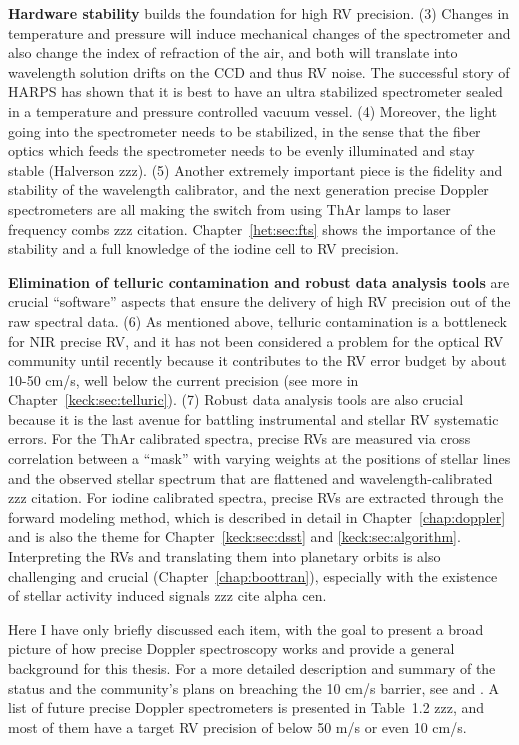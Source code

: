 {\bf Hardware stability} builds the foundation for high RV
precision. (3) Changes in temperature and pressure will induce mechanical
changes of the spectrometer and also change the index of refraction of
the air, and both will translate into wavelength solution drifts on
the CCD and thus RV noise. The successful story of HARPS has shown
that it is best to have an ultra stabilized spectrometer sealed in a
temperature and pressure controlled vacuum vessel. (4) Moreover, the light
going into the spectrometer needs to be stabilized, in the sense that
the fiber optics which feeds the spectrometer needs to be evenly
illuminated and stay stable (Halverson zzz). (5) Another extremely
important piece is the fidelity and stability of the wavelength
calibrator, and the next generation precise Doppler spectrometers are
all making the switch from using ThAr lamps to laser frequency combs
zzz citation. Chapter~\ref{het:sec:fts} shows the importance of the
stability and a full knowledge of the iodine cell to RV precision.

{\bf Elimination of telluric contamination and robust data analysis
tools} are crucial ``software'' aspects that ensure the delivery of
high RV precision out of the raw spectral data. (6) As mentioned
above, telluric contamination is a bottleneck for NIR precise RV, and
it has not been considered a problem for the optical RV community
until recently because it contributes to the RV error budget by about
10-50 cm/s, well below the current precision (see more in
Chapter~\ref{keck:sec:telluric}). (7) Robust data analysis tools are
also crucial because it is the last avenue for battling instrumental
and stellar RV systematic errors. For the ThAr calibrated spectra,
precise RVs are measured via cross correlation between a ``mask'' with
varying weights at the positions of stellar lines and the observed
stellar spectrum that are flattened and wavelength-calibrated zzz
citation. For iodine calibrated spectra, precise RVs are extracted
through the forward modeling method, which is described in detail in
Chapter~\ref{chap:doppler} and is also the theme for
Chapter~\ref{keck:sec:dsst} and \ref{keck:sec:algorithm}. Interpreting
the RVs and translating them into planetary orbits is also challenging
and crucial (Chapter~\ref{chap:boottran}), especially with the
existence of stellar activity induced signals zzz cite alpha cen.

Here I have only briefly discussed each item, with the goal to present
a broad picture of how precise Doppler spectroscopy works and provide
a general background for this thesis. For a more detailed description
and summary of the status and the community's plans on breaching the
10 cm/s barrier, see \cite{exopag2015} and \cite{eprv2015}. A list of
future precise Doppler spectrometers is presented in Table~1.2 zzz,
and most of them have a target RV precision of below 50 m/s or even 10
cm/s.


